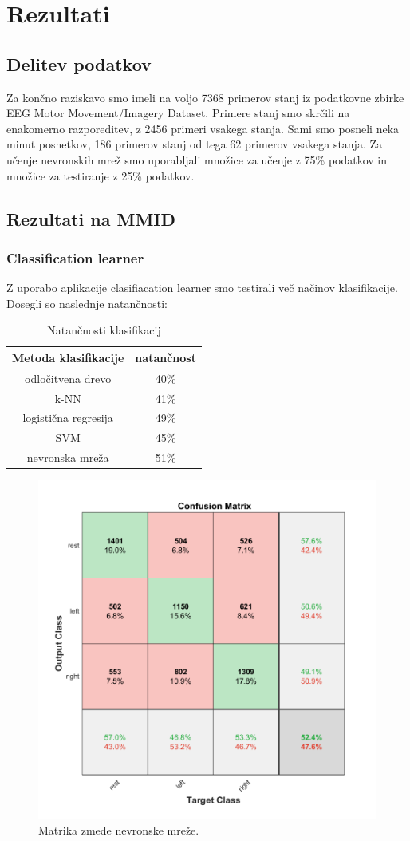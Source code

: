 \chapter{Rezultati}
\section{Delitev podatkov}
Za končno raziskavo smo imeli na voljo 7368 primerov stanj iz podatkovne zbirke EEG Motor Movement/Imagery Dataset. Primere stanj smo skrčili na enakomerno razporeditev, z 2456 primeri vsakega stanja. Sami smo posneli neka minut posnetkov, 186 primerov stanj od tega 62 primerov vsakega stanja. Za učenje nevronskih mrež smo uporabljali množice za učenje z 75\% podatkov in množice za testiranje z 25\% podatkov.



\section{Rezultati na MMID}
\subsection{Classification learner}
Z uporabo aplikacije clasifiacation learner smo testirali več načinov klasifikacije. Dosegli so naslednje natančnosti:
\begin{table}[h]
\centering
\begin{tabular}{|c|c|}
\hline
Metoda klasifikacije & natančnost \\
\hline
odločitvena drevo & 40\% \\
\hline
k-NN & 41\% \\
\hline
logistična regresija & 49\% \\
\hline
SVM & 45\% \\
\hline
nevronska mreža & 51\% \\
\hline
\end{tabular}
\caption{Natančnosti klasifikacij}
\end{table}

\begin{figure}[h!]
\begin{center}
\includegraphics[width=0.5\linewidth]{slike/Confusion_13-20Hz_0s-4s.png}
\end{center}
\caption{Matrika zmede nevronske mreže.}
\end{figure}



